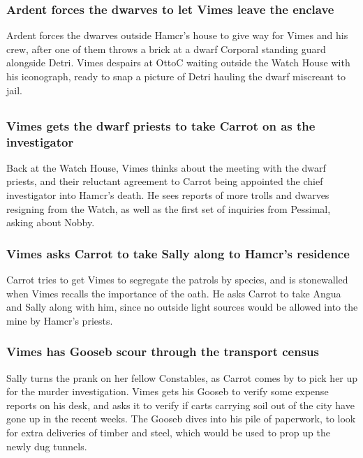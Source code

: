 \subsubsection{\Gls{Ardent} forces the dwarves to let \Gls{Vimes} leave the enclave}
\Gls{Ardent} forces the dwarves outside \Gls{Hamcr}'s house to give way for \Gls{Vimes} and his
crew, after one of them throws a brick at a dwarf Corporal standing guard alongside \Gls{Detri}.
\Gls{Vimes} despairs at \Gls{OttoC} waiting outside the Watch House with his iconograph, ready to
snap a picture of \Gls{Detri} hauling the dwarf miscreant to jail.

\subsection{}
\subsubsection{\Gls{Vimes} gets the dwarf priests to take \Gls{Carrot} on as the investigator}
Back at the Watch House, \Gls{Vimes} thinks about the meeting with the dwarf priests, and their
reluctant agreement to \Gls{Carrot} being appointed the chief investigator into \Gls{Hamcr}'s
death. He sees reports of more trolls and dwarves resigning from the Watch, as well as the first
set of inquiries from \Gls{Pessimal}, asking about \Gls{Nobby}.

\subsubsection{\Gls{Vimes} asks \Gls{Carrot} to take \Gls{Sally} along to \Gls{Hamcr}'s residence}
\Gls{Carrot} tries to get \Gls{Vimes} to segregate the patrols by species, and is stonewalled when
\Gls{Vimes} recalls the importance of the oath. He asks \Gls{Carrot} to take \Gls{Angua} and
\Gls{Sally} along with him, since no outside light sources would be allowed into the mine by
\Gls{Hamcr}'s priests.

\subsubsection{\Gls{Vimes} has \Gls{Gooseb} scour through the transport census}
\Gls{Sally} turns the prank on her fellow Constables, as \Gls{Carrot} comes by to pick her up for
the murder investigation. \Gls{Vimes} gets his \Gls{Gooseb} to verify some expense reports on his
desk, and asks it to verify if carts carrying soil out of the city have gone up in the recent weeks.
The \Gls{Gooseb} dives into his pile of paperwork, to look for extra deliveries of timber and steel,
which would be used to prop up the newly dug tunnels.

